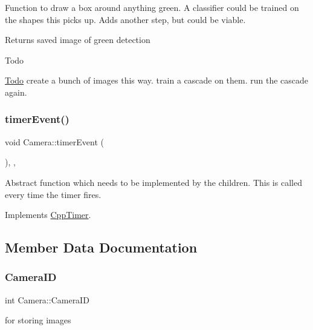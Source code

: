 Function to draw a box around anything green. A classifier could be trained on the shapes this picks up. Adds another step, but could be viable.

\begin{DoxyReturn}{Returns}
saved image of green detection
\end{DoxyReturn}
\begin{DoxyRefDesc}{Todo}
\item[\hyperlink{todo__todo000004}{Todo}]create a bunch of images this way. train a cascade on them. run the cascade again. \end{DoxyRefDesc}
\mbox{\label{classCamera_afcf6ca7256cd36f2f4a5ba088d67090a}} 
\subsubsection{\texorpdfstring{timer\+Event()}{timerEvent()}}
{\footnotesize\ttfamily void Camera\+::timer\+Event (\begin{DoxyParamCaption}{ }\end{DoxyParamCaption})\hspace{0.3cm}{\ttfamily [inline]}, {\ttfamily [private]}, {\ttfamily [virtual]}}

Abstract function which needs to be implemented by the children. This is called every time the timer fires. 

Implements \hyperlink{classCppTimer_ac2665403595b6aee5f581d0ebfeb886c}{Cpp\+Timer}.



\subsection{Member Data Documentation}
\mbox{\label{classCamera_a96c19741cb6ba7a897ca90746e8b8918}} 
\subsubsection{\texorpdfstring{Camera\+ID}{CameraID}}
{\footnotesize\ttfamily int Camera\+::\+Camera\+ID\hspace{0.3cm}{\ttfamily [private]}}



for storing images 

